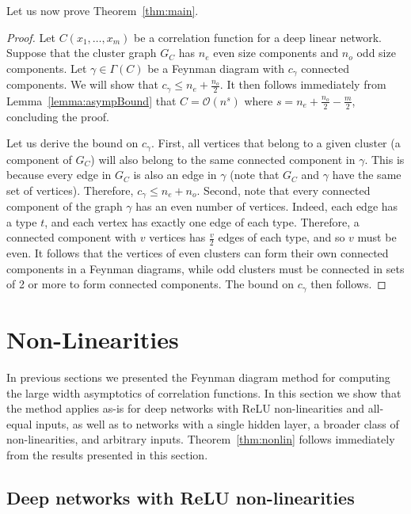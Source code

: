 \documentclass[english]{article}
\newcommand{\cO}{\ensuremath{\mathcal{O}}}
\begin{document}
Let us now prove Theorem~\ref{thm:main}.
\begin{proof}
  Let $C(x_1,\dots,x_m)$ be a correlation function for a deep linear network.
  Suppose that the cluster graph $G_C$ has $n_e$ even size components and $n_o$ odd size components.
  Let $\gamma \in \Gamma(C)$ be a Feynman diagram with $c_\gamma$ connected components.
  We will show that $c_\gamma \le n_e + \frac{n_o}{2}$.
  It then follows immediately from Lemma~\ref{lemma:asympBound} that $C = \cO(n^s)$ where $s = n_e + \frac{n_o}{2} - \frac{m}{2}$, concluding the proof.

  Let us derive the bound on $c_\gamma$.
  First, all vertices that belong to a given cluster (a component of $G_C$) will also belong to the same connected component in $\gamma$.
  This is because every edge in $G_C$ is also an edge in $\gamma$ (note that $G_C$ and $\gamma$ have the same set of vertices).
  Therefore, $c_\gamma \le n_e + n_o$.
  Second, note that every connected component of the graph $\gamma$ has an even number of vertices.
  Indeed, each edge has a type $t$, and each vertex has exactly one edge of each type.
  Therefore, a connected component with $v$ vertices has $\frac{v}{2}$ edges of each type, and so $v$ must be even.
  It follows that the vertices of even clusters can form their own connected components in a Feynman diagrams, while odd clusters must be connected in sets of 2 or more to form connected components.
  The bound on $c_\gamma$ then follows.
\end{proof}



\section{Non-Linearities}
\label{app:non-lin}

In previous sections we presented the Feynman diagram method for computing the large width asymptotics of correlation functions.
In this section we show that the method applies as-is for deep networks with ReLU non-linearities and all-equal inputs, as well as to networks with a single hidden layer, a broader class of non-linearities, and arbitrary inputs.
Theorem~\ref{thm:nonlin} follows immediately from the results presented in this section.

\subsection{Deep networks with ReLU non-linearities}
\end{document}
